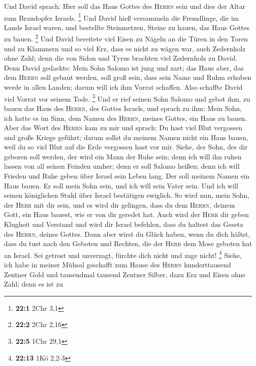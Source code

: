  Und David sprach: Hier soll das Haus Gottes des
\textsc{Herrn} sein und dies der Altar zum Brandopfer Israels.
\footnote{\textbf{22:1} 2Chr 3,1}  Und David hieß
versammeln die Fremdlinge, die im Lande Israel waren, und bestellte
Steinmetzen, Steine zu hauen, das Haus Gottes zu bauen. \footnote{\textbf{22:2}
  2Chr 2,16}  Und David bereitete viel Eisen zu Nägeln an
die Türen in den Toren und zu Klammern und so viel Erz, dass es nicht zu
wägen war,  auch Zedernholz ohne Zahl; denn die von Sidon
und Tyrus brachten viel Zedernholz zu David.  Denn David
gedachte: Mein Sohn Salomo ist jung und zart; das Haus aber, das dem
\textsc{Herrn} soll gebaut werden, soll groß sein, dass sein Name und
Ruhm erhoben werde in allen Landen; darum will ich ihm Vorrat schaffen.
Also schaffte David viel Vorrat vor seinem Tode. \footnote{\textbf{22:5}
  1Chr 29,1}  Und er rief seinen Sohn Salomo und gebot
ihm, zu bauen das Haus des \textsc{Herrn}, des Gottes Israels,
 und sprach zu ihm: Mein Sohn, ich hatte es im Sinn, dem
Namen des \textsc{Herrn}, meines Gottes, ein Haus zu bauen.
 Aber das Wort des \textsc{Herrn} kam zu mir und sprach:
Du hast viel Blut vergossen und große Kriege geführt; darum sollst du
meinem Namen nicht ein Haus bauen, weil du so viel Blut auf die Erde
vergossen hast vor mir.  Siehe, der Sohn, der dir geboren
soll werden, der wird ein Mann der Ruhe sein; denn ich will ihn ruhen
lassen von all seinen Feinden umher; denn er soll Salomo heißen; denn
ich will Frieden und Ruhe geben über Israel sein Leben lang.
 Der soll meinem Namen ein Haus bauen. Er soll mein Sohn
sein, und ich will sein Vater sein. Und ich will seinen königlichen
Stuhl über Israel bestätigen ewiglich.  So wird nun, mein
Sohn, der \textsc{Herr} mit dir sein, und es wird dir gelingen, dass du
dem \textsc{Herrn}, deinem Gott, ein Haus bauest, wie er von dir geredet
hat.  Auch wird der \textsc{Herr} dir geben Klugheit und
Verstand und wird dir Israel befehlen, dass du haltest das Gesetz des
\textsc{Herrn}, deines Gottes.  Dann aber wirst du Glück
haben, wenn du dich hältst, dass du tust nach den Geboten und Rechten,
die der \textsc{Herr} dem Mose geboten hat an Israel. Sei getrost und
unverzagt, fürchte dich nicht und zage nicht! \footnote{\textbf{22:13}
  1Kö 2,2-3}  Siehe, ich habe in meiner Mühsal geschafft
zum Hause des \textsc{Herrn} hunderttausend Zentner Gold und tausendmal
tausend Zentner Silber, dazu Erz und Eisen ohne Zahl; denn es ist zu
